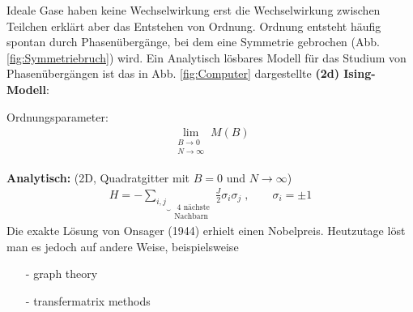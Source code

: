 \documentclass[12pt]{article}
\begin{document}
Ideale Gase haben keine Wechselwirkung erst die Wechselwirkung zwischen Teilchen erklärt aber das Entstehen von Ordnung. Ordnung entsteht häufig spontan durch Phasenübergänge, bei dem eine Symmetrie gebrochen (Abb. \ref{fig:Symmetriebruch}) wird. Ein Analytisch lösbares Modell für das Studium von Phasenübergängen ist das in Abb. \ref{fig:Computer} dargestellte \textbf{ (2d) Ising-Modell}: 

Ordnungsparameter: 
\begin{align*}
 \lim\limits_{\substack{B \to 0 \\ N \to \infty}} M(B)
\end{align*}

\textbf{Analytisch:}  (2D, Quadratgitter mit $B=0$ und $N \to \infty$) 
\begin{align}
H= - \underbrace{ \sum_{i,j}}_{\substack{\text{ 4 nächste} \\ \text{Nachbarn}}} \frac{J}{2}\sigma_i \sigma_j \; , \quad \quad \sigma_i=\pm 1
\end{align}
Die exakte Lösung von Onsager (1944) erhielt einen Nobelpreis. Heutzutage löst man es jedoch auf andere Weise, beispielsweise
\begin{itemize}
\item[-] graph theory
\item[-] transfermatrix methods
\end{itemize} 
\end{document}
